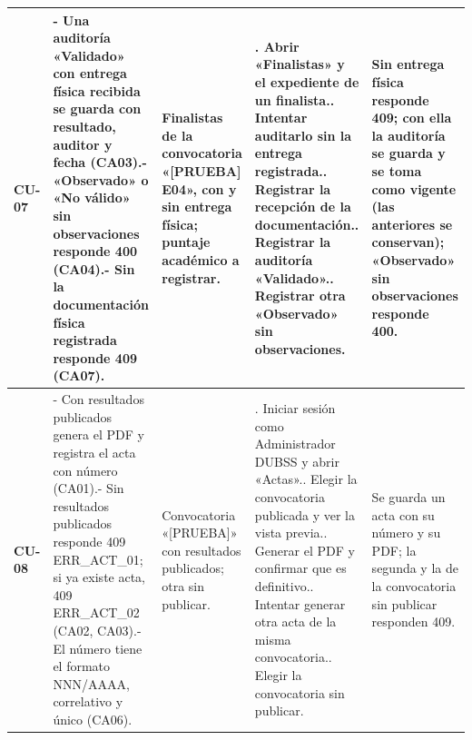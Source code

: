 {\begin{longtable}{@{}>{\raggedright\arraybackslash}p{1.2cm}>{\raggedright\arraybackslash}p{3.7cm}>{\raggedright\arraybackslash}p{3.0cm}>{\raggedright\arraybackslash}p{4.4cm}>{\raggedright\arraybackslash}p{3.4cm}@{}}
\textbf{CU-07} & - Una auditoría «Validado» con entrega física recibida se guarda con resultado, auditor y fecha (CA03).\newline - «Observado» o «No válido» sin observaciones responde 400 (CA04).\newline - Sin la documentación física registrada responde 409 (CA07). & Finalistas de la convocatoria «[PRUEBA] E04», con y sin entrega física; puntaje académico a registrar. & 1. Abrir «Finalistas» y el expediente de un finalista.\newline 2. Intentar auditarlo sin la entrega registrada.\newline 3. Registrar la recepción de la documentación.\newline 4. Registrar la auditoría «Validado».\newline 5. Registrar otra «Observado» sin observaciones. & Sin entrega física responde 409; con ella la auditoría se guarda y se toma como vigente (las anteriores se conservan); «Observado» sin observaciones responde 400. \\
\midrule
\textbf{CU-08} & - Con resultados publicados genera el PDF y registra el acta con número (CA01).\newline - Sin resultados publicados responde 409 ERR\_ACT\_01; si ya existe acta, 409 ERR\_ACT\_02 (CA02, CA03).\newline - El número tiene el formato NNN/AAAA, correlativo y único (CA06). & Convocatoria «[PRUEBA]» con resultados publicados; otra sin publicar. & 1. Iniciar sesión como Administrador DUBSS y abrir «Actas».\newline 2. Elegir la convocatoria publicada y ver la vista previa.\newline 3. Generar el PDF y confirmar que es definitivo.\newline 4. Intentar generar otra acta de la misma convocatoria.\newline 5. Elegir la convocatoria sin publicar. & Se guarda un acta con su número y su PDF; la segunda y la de la convocatoria sin publicar responden 409. \\
\midrule

\end{longtable}}

